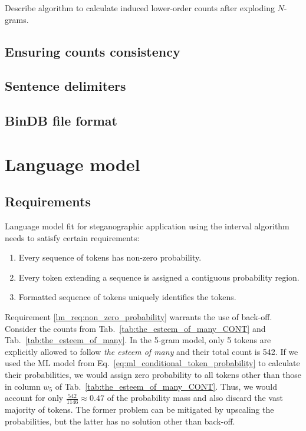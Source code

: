 \documentclass{IIBproject}
\begin{document}
Describe algorithm to calculate induced lower-order counts after exploding $N$-grams.

\subsection{Ensuring counts consistency}

\subsection{Sentence delimiters}

\subsection{BinDB file format}

\section{Language model}

\subsection{Requirements}
\label{eq:lm_requirements}

Language model fit for steganographic application using the interval algorithm needs to satisfy certain requirements:

\begin{enumerate}
  \item \label{lm_req:non_zero_probability} Every sequence of tokens has non-zero probability.
  \item \label{lm_req:contiguous_probability} Every token extending a sequence is assigned a contiguous probability region.
  \item \label{lm_req:hidden_symbols} Formatted sequence of tokens uniquely identifies the tokens.
\end{enumerate}

Requirement \ref{lm_req:non_zero_probability} warrants the use of back-off. Consider the counts from Tab.~\ref{tab:the_esteem_of_many_CONT} and Tab.~\ref{tab:the_esteem_of_many}. In the 5-gram model, only 5 tokens are explicitly allowed to follow \emph{the esteem of many} and their total count is 542. If we used the ML model from Eq.~\ref{eq:ml_conditional_token_probability} to calculate their probabilities, we would assign zero probability to all tokens other than those in column $w_5$ of Tab.~\ref{tab:the_esteem_of_many_CONT}. Thus, we would account for only $\frac {542} {1146} \approx 0.47$ of the probability mass and also discard the vast majority of tokens. The former problem can be mitigated by upscaling the probabilities, but the latter has no solution other than back-off.
\end{document}
